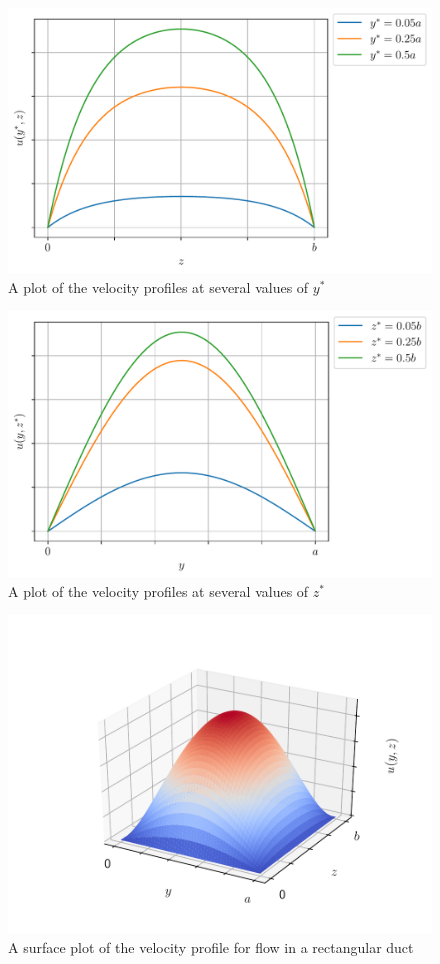 \begin{figure}[H]
    \centering
    \includegraphics[scale=0.75]{figures/rect-duct_ystar.pdf}
    \caption{A plot of the velocity profiles at several values of $y^*$}
    \label{fig:ystar}
\end{figure}

\begin{figure}[H]
    \centering
    \includegraphics[scale=0.75]{figures/rect-duct_zstar.pdf}
    \caption{A plot of the velocity profiles at several values of $z^*$}
    \label{fig:zstar}
\end{figure}

\begin{figure}[H]
    \centering
    \includegraphics[scale=0.85]{figures/rect-duct_velocity-profile.pdf}
    \caption{A surface plot of the velocity profile for flow in a rectangular duct}
\end{figure}